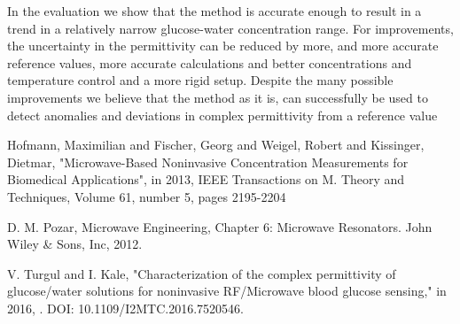 \documentclass[10pt,final,conference,a4paper,twocolumn]{IEEEtran_AntennEMB_GigaHertz2016}
\begin{document}
In the evaluation we show that the method is accurate enough to result in a trend in a relatively narrow glucose-water concentration range. For improvements, the uncertainty in the permittivity can be reduced by more, and more accurate reference values, more accurate calculations and better concentrations and temperature control and a more rigid setup. Despite the many possible improvements we believe that the method as it is, can successfully be used to detect anomalies and deviations in complex permittivity from a reference value







%
%


\begin{thebibliography}{99}
	
	
	
	 Hofmann, Maximilian and Fischer, Georg and Weigel, Robert and Kissinger, Dietmar, "Microwave-Based Noninvasive Concentration Measurements for Biomedical Applications", in 2013, IEEE Transactions on M. Theory and Techniques, Volume 61, number 5, pages 2195-2204
	
	 D. M. Pozar, Microwave Engineering, Chapter 6: Microwave Resonators. John Wiley \& Sons,
	Inc, 2012.
	
	 V. Turgul and I. Kale, "Characterization of the complex permittivity of glucose/water solutions for noninvasive RF/Microwave blood glucose sensing," in 2016, . DOI: 10.1109/I2MTC.2016.7520546.
\end{thebibliography}
\end{document}
